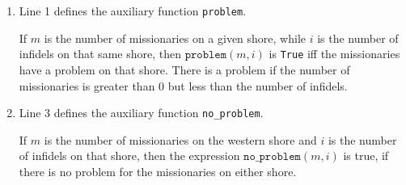 \begin{enumerate}
\item Line 1 defines the auxiliary function \texttt{problem}.

      If $m$ is the number of missionaries on a given shore, while $i$ is the number of infidels on
      that same shore, then $\texttt{problem}(m, i)$ is \texttt{True} iff the missionaries have a problem on that
      shore.  There is a problem if the number of missionaries is greater than $0$ but less than the number of
      infidels. 
\item Line 3 defines the auxiliary function \texttt{no\_problem}.

      If $m$ is the number of missionaries on the western shore and $i$ is the number of infidels on
      that shore, then the expression $\texttt{no\_problem}(m, i)$ is true, if there is no problem
      for the missionaries on either shore.


\end{enumerate}
